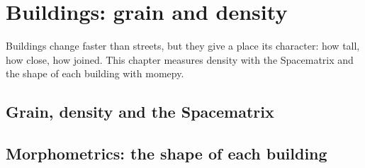 \chapter{Buildings: grain and density}\label{ch:buildings}

Buildings change faster than streets, but they give a place its character: how tall, how close, how joined. This chapter measures density with the Spacematrix and the shape of each building with momepy.

\section{Grain, density and the Spacematrix}

\section{Morphometrics: the shape of each building}

